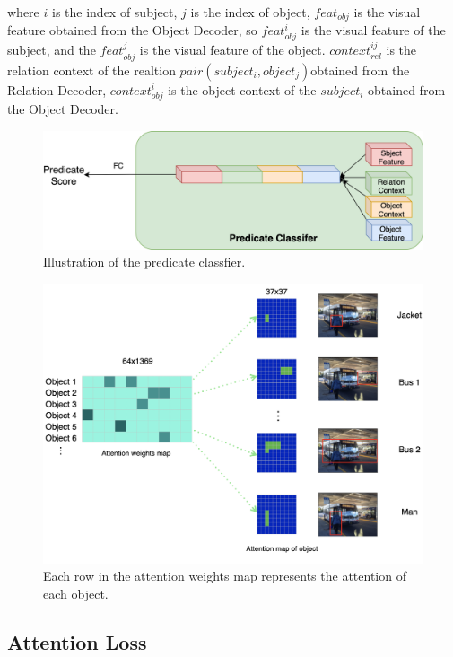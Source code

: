 where $ i $ is the index of subject, $ j $ is the index of object,  $ feat_{obj} $ is the visual feature obtained from the Object Decoder, so $ feat_{obj}^i $ is the visual feature of the subject, and the $ feat_{obj}^j $ is the visual feature of the object. $ context_{rel}^{ij} $ is the relation context of the realtion $ pair(subject_i,object_j)  $obtained from the Relation Decoder, $  context_{obj}^i $ is the object context of the $subject_i$ obtained from the Object Decoder.

 \begin{figure}[tbph!]
 	\centering
 	\includegraphics[width=1\linewidth]{figures/predicate_classifer}
 	\caption[Illustration of the predicate classfier]{Illustration of the predicate classfier.}
 	\label{fig:predicateclassifer}
 \end{figure}
 
 
 \begin{figure}[h]
 	\centering
 	\includegraphics[width=0.8\linewidth]{figures/attention_map}
 	\caption[Illustration of the attention map]{Each row in the attention weights map represents the attention of each object. }
 	\label{fig:attentionmap}
 \end{figure}
 

\subsection{Attention Loss}

